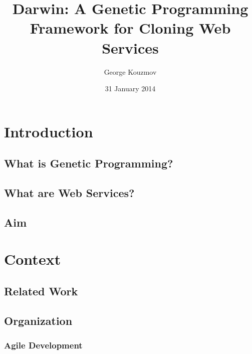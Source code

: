 \documentclass{l4proj}
\begin{document}
\title{Darwin: A Genetic Programming Framework for Cloning Web Services}
\author{George Kouzmov}
\date{31 January 2014}
\maketitle

\tableofcontents
\listoffigures
\listoftables
\chapter{Introduction}


\section{What is Genetic Programming?}


\section{What are Web Services?}


\section{Aim}


\chapter{Context}

\section{Related Work}


\section{Organization}


\subsection{Agile Development}

\end{document}
